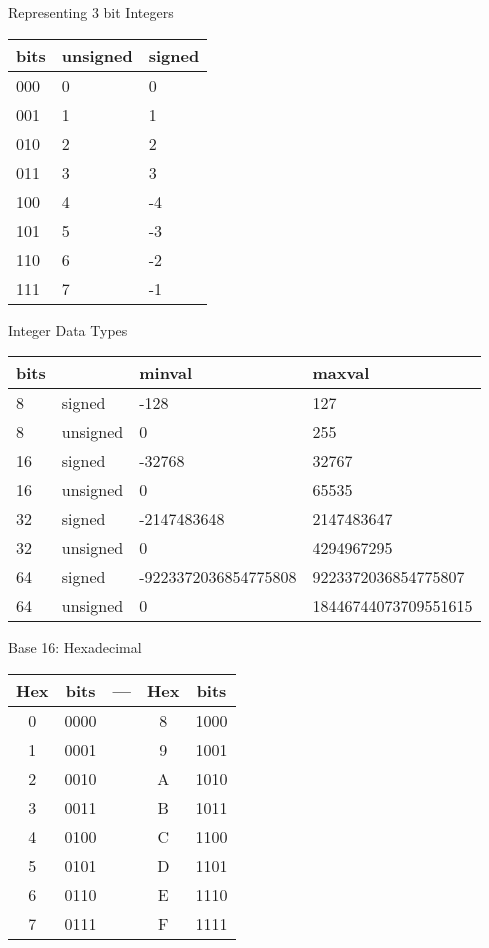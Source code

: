 \begin{withoutheadline}
\begin{frame}[fragile]{Representing 3 bit Integers}
\begin{tabular}{p{2.5cm}|p{2.5cm}|p{2.5cm}} \toprule    
     bits & unsigned & signed \\ \midrule
     000  &        0 &      0 \\
     001  &        1 &      1 \\
     010  &        2 &      2 \\
     011  &        3 &      3 \\
     100  &        4 &     -4 \\
     101  &        5 &     -3 \\
     110  &        6 &     -2 \\
     111  &        7 &     -1 \\ \bottomrule
\end{tabular}
\end{frame}

\begin{frame}[fragile]{Integer Data Types}
\begin{tabular}{p{1.5cm}|p{2.5cm}|p{2.5cm}|p{2.5cm}} \toprule
bits &          &               minval &               maxval \\ \midrule
8    &   signed &                 -128 &                  127 \\
8    & unsigned &                    0 &                  255 \\
16   &   signed &               -32768 &                32767 \\
16   & unsigned &                    0 &                65535 \\
32   &   signed &          -2147483648 &           2147483647 \\
32   & unsigned &                    0 &           4294967295 \\
64   &   signed & -9223372036854775808 &  9223372036854775807 \\
64   & unsigned & 0                    & 18446744073709551615 \\ \bottomrule
\end{tabular}
\end{frame}

\begin{frame}[fragile]{Base 16: Hexadecimal}
\begin{tabular}{c|c|c|c|c} \toprule
    Hex & bits & --- & Hex & bits  \\ \midrule 
    0 & 0000 & & 8 & 1000 \\
    1 & 0001 & & 9 & 1001 \\
    2 & 0010 & & A & 1010 \\
    3 & 0011 & & B & 1011 \\
    4 & 0100 & & C & 1100 \\
    5 & 0101 & & D & 1101 \\
    6 & 0110 & & E & 1110 \\
    7 & 0111 & & F & 1111 \\    \bottomrule
\end{tabular}
\end{frame}
    

\end{withoutheadline}
